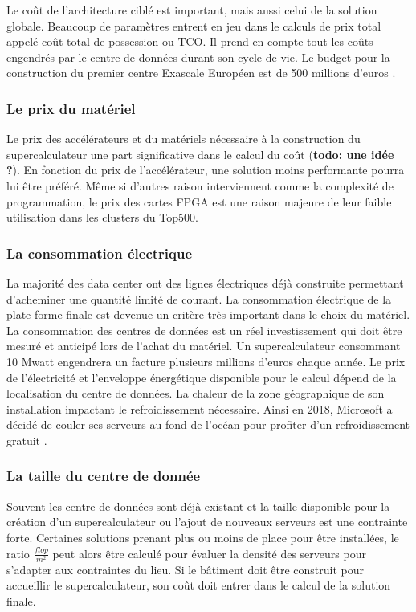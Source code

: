 Le coût de l'architecture ciblé est important, mais aussi celui de la solution globale. Beaucoup de paramètres entrent en jeu dans le calculs de prix total appelé coût total de possession ou $\text{TCO}$. Il prend en compte tout les coûts engendrés par le centre de données durant son cycle de vie. Le budget pour la construction du premier centre Exascale Européen est de 500 millions d'euros \cite{SergiGirona2018}.

\subsubsection{Le prix du matériel} 
Le  prix des accélérateurs et du matériels nécessaire à la construction du supercalculateur une part significative dans le calcul du coût (\textbf{todo: une idée ?}). En fonction du prix de l'accélérateur, une solution moins performante pourra lui être préféré. Même si d'autres raison interviennent comme la complexité de programmation, le prix des cartes FPGA est une raison majeure de leur faible utilisation dans les clusters du Top500.

\subsubsection{La consommation électrique}
La majorité des data center ont des lignes électriques déjà construite permettant d’acheminer une quantité limité de courant. La consommation électrique de la plate-forme finale est devenue un critère très important dans le choix du matériel. La consommation des centres de données est un réel investissement qui doit être mesuré et anticipé lors de l'achat du matériel. Un supercalculateur consommant 10 Mwatt engendrera un facture plusieurs millions d'euros chaque année. Le prix de l'électricité et l'enveloppe énergétique disponible pour le calcul dépend de la localisation du centre de données. La chaleur de la zone géographique de son installation impactant le refroidissement nécessaire. Ainsi en 2018, Microsoft a décidé de couler ses serveurs au fond de l'océan pour profiter d'un refroidissement gratuit \cite{ChristineHall2018}.

\subsubsection{La taille du centre de donnée} 
Souvent les centre de données sont déjà existant et la taille disponible pour la création d'un supercalculateur ou l'ajout de nouveaux serveurs est une contrainte forte. Certaines solutions prenant plus ou moins de place pour être installées, le ratio $\frac{flop}{m^2}$ peut alors être calculé pour évaluer la densité des serveurs pour s'adapter aux contraintes du lieu. Si le bâtiment doit être construit pour accueillir le supercalculateur, son coût doit entrer dans le calcul de la solution finale.




